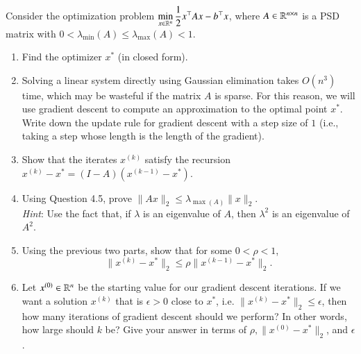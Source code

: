 \documentclass[11pt]{article}
\begin{document}
\newpage
{}

    Consider the optimization problem $\displaystyle \min_{x \in \mathbb{R}^n} \frac{1}{2} x^\top A x - b^\top x$, where $A\in\mathbb{R}^{n\times n}$ is a PSD matrix with $0 < \lambda_{\min} (A) \leq \lambda_{\max} (A) < 1$.
    \begin{enumerate}
    \item Find the optimizer $x^*$ (in closed form).
    
    
    \item Solving a linear system directly using Gaussian elimination takes $O (n^3)$ time, which may be wasteful if the matrix $A$ is sparse. For this reason, we will use gradient descent to compute an approximation to the optimal point $x^*$. Write down the update rule for gradient descent with a step size of $1$ (i.e., taking a step whose length is the length of the gradient).
    
    
    
    \item Show that the iterates $x^{(k)}$ satisfy the recursion $x^{(k)} - x^* = (I - A) (x^{(k-1)} - x^*)$.
    
    
    
    \item Using Question 4.5, prove $\|Ax\|_2\leq \lambda_{\max(A)}\|x\|_2$.\\
    \emph{Hint}: Use the fact that, if $\lambda$ is an eigenvalue of $A$, then $\lambda^2$ is an eigenvalue of $A^2$.
    
    
    
    \item Using the previous two parts, show that for some $0 < \rho < 1$,
    \[ \| x^{(k)} - x^* \|_2 \leq \rho \| x^{(k-1)} - x^* \|_2. \]
    
    

    \item Let $x^{(0)} \in \mathbb{R}^n$ be the starting value for our gradient descent iterations. If we want a solution $x^{(k)}$ that is $\epsilon > 0$ close to $x^*$, i.e. $\| x^{(k)} - x^* \|_2 \leq \epsilon$, then how many iterations of gradient descent should we perform?  In other words, how large should $k$ be?  Give your answer in terms of $\rho, \|x^{(0)} - x^* \|_2$, and $\epsilon$.
    
    
    

\end{enumerate}
\end{document}
